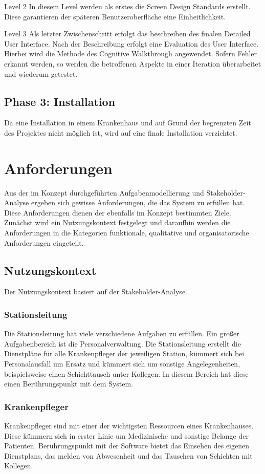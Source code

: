 \documentclass[11pt,
paper=a4,
bibtotocnumbered,	  %
liststotocnumbered,  %
DIV=calc,		  %
tablecaptionabove,	  %
headinclude,
]{article}
\begin{document}
Level 2
In diesem Level werden als erstes die Screen Design Standards erstellt. Diese garantieren der späteren Benutzeroberfläche eine Einheitlichkeit. 

Level 3 
Als letzter Zwischenschritt erfolgt das beschreiben des finalen Detailed User Interface. Nach der Beschreibung erfolgt eine Evaluation des User Interface. Hierbei wird die Methode des Cognitive Walkthrough angewendet. Sofern Fehler erkannt werden, so werden die betroffenen Aspekte in einer Iteration überarbeitet und wiederum getestet.  
\subsection{Phase 3: Installation}
Da eine Installation in einem Krankenhaus und auf Grund der begrenzten Zeit des Projektes nicht möglich ist, wird auf eine finale Installation verzichtet. 
\section{Anforderungen}
Aus der im Konzept durchgeführten Aufgabenmodellierung und Stakeholder-Analyse ergeben sich gewisse Anforderungen, die das System zu erfüllen hat. Diese Anforderungen dienen der ebenfalls im Konzept bestimmten Ziele. Zunächst wird ein Nutzungskontext festgelegt und daraufhin werden die Anforderungen in die Kategorien funktionale, qualitative und organisatorische Anforderungen eingeteilt. 
\subsection{Nutzungskontext}
Der Nutzungskontext basiert auf der Stakeholder-Analyse.
\subsubsection{Stationsleitung}

Die Stationsleitung hat viele verschiedene Aufgaben zu erfüllen. Ein großer Aufgabenbereich ist die Personalverwaltung. Die Stationsleitung erstellt die Dienstpläne für alle Krankenpfleger der jeweiligen Station, kümmert sich bei Personalausfall um Ersatz und kümmert sich um sonstige Angelegenheiten, beispielsweise einen Schichttausch unter Kollegen. In diesem Bereich hat diese einen Berührungspunkt mit dem System.

\subsubsection{Krankenpfleger}
Krankenpfleger sind mit einer der wichtigsten Ressourcen eines Krankenhauses. Diese kümmern sich in erster Linie um Medizinische und sonstige Belange der Patienten. Berührungspunkt mit der Software bietet das Einsehen des eigenen Dienstplans, das melden von Abwesenheit und das Tauschen von Schichten mit Kollegen. 
\end{document}
